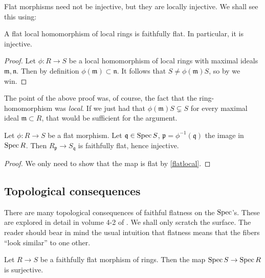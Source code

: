 Flat morphisms need not be injective, but they are locally injective. We shall see this using:
\begin{proposition}  \label{flatlocal}
A flat local homomorphism of local rings is faithfully flat. In particular, it
is injective.
\end{proposition} 
\begin{proof} 
Let $\phi: R \to S$ be a local homomorphism of local rings with maximal ideals
$\mathfrak{m}, \mathfrak{n}$. Then by definition $\phi(\mathfrak{m}) \subset
\mathfrak{n}$. It follows that $S \neq \phi(\mathfrak{m})S$, so by
 we win.
\end{proof} 
The point of the above proof was, of course, the fact that the
ring-homomorphism was \emph{local}. If we just had that $\phi( \mathfrak{m})S
\subsetneq S$ for every maximal ideal $\mathfrak{m} \subset R$, that would be
sufficient for the argument.

\begin{corollary} 
Let $\phi: R \to S$ be a flat morphism. Let $\mathfrak{q} \in \operatorname{Spec} S$,
$\mathfrak{p} = \phi^{-1}(\mathfrak{q})$ the image in $\operatorname{Spec} R$. Then 
$R_{\mathfrak{p}} \to S_{\mathfrak{q}}$ is faithfully flat, hence injective.
\end{corollary} 
\begin{proof} 
We only need to show that the map is flat by \cref{flatlocal}. 
\end{proof} 

\subsection{Topological consequences}

There are many topological consequences of faithful flatness on the $\operatorname{Spec}$'s.
These are
explored in detail in volume 4-2 of \cite{EGA}. We shall only scratch the
surface.
The reader 
should bear in mind the usual intuition that flatness means that the fibers
``look similar'' to one other. 

\begin{proposition} 
Let $R \to S$ be a faithfully flat morphism of rings. Then the map $\operatorname{Spec} S
\to \operatorname{Spec} R$ is surjective.
\end{proposition} 


